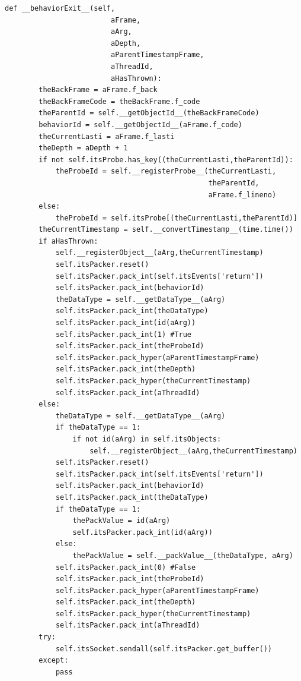 \documentclass[12pt,legalpaper]{report}
\begin{document}
\begin{singlespace}
\begin{lstlisting}[style=Python]
    def __behaviorExit__(self,
                         aFrame,
                         aArg,
                         aDepth,
                         aParentTimestampFrame,
                         aThreadId,
                         aHasThrown):
        theBackFrame = aFrame.f_back
        theBackFrameCode = theBackFrame.f_code
        theParentId = self.__getObjectId__(theBackFrameCode)
        behaviorId = self.__getObjectId__(aFrame.f_code)
        theCurrentLasti = aFrame.f_lasti
        theDepth = aDepth + 1
        if not self.itsProbe.has_key((theCurrentLasti,theParentId)):
            theProbeId = self.__registerProbe__(theCurrentLasti,
                                                theParentId,
                                                aFrame.f_lineno)
        else:
            theProbeId = self.itsProbe[(theCurrentLasti,theParentId)]
        theCurrentTimestamp = self.__convertTimestamp__(time.time())
        if aHasThrown:                  
            self.__registerObject__(aArg,theCurrentTimestamp)
            self.itsPacker.reset()
            self.itsPacker.pack_int(self.itsEvents['return'])
            self.itsPacker.pack_int(behaviorId)
            theDataType = self.__getDataType__(aArg)
            self.itsPacker.pack_int(theDataType)
            self.itsPacker.pack_int(id(aArg))
            self.itsPacker.pack_int(1) #True
            self.itsPacker.pack_int(theProbeId)
            self.itsPacker.pack_hyper(aParentTimestampFrame)        
            self.itsPacker.pack_int(theDepth)
            self.itsPacker.pack_hyper(theCurrentTimestamp)
            self.itsPacker.pack_int(aThreadId)
        else:
            theDataType = self.__getDataType__(aArg)
            if theDataType == 1:
                if not id(aArg) in self.itsObjects:
                    self.__registerObject__(aArg,theCurrentTimestamp)
            self.itsPacker.reset()
            self.itsPacker.pack_int(self.itsEvents['return'])
            self.itsPacker.pack_int(behaviorId)
            self.itsPacker.pack_int(theDataType)
            if theDataType == 1:
                thePackValue = id(aArg)
                self.itsPacker.pack_int(id(aArg))
            else:
                thePackValue = self.__packValue__(theDataType, aArg)            
            self.itsPacker.pack_int(0) #False
            self.itsPacker.pack_int(theProbeId)
            self.itsPacker.pack_hyper(aParentTimestampFrame)        
            self.itsPacker.pack_int(theDepth)
            self.itsPacker.pack_hyper(theCurrentTimestamp)
            self.itsPacker.pack_int(aThreadId)
        try:
            self.itsSocket.sendall(self.itsPacker.get_buffer())
        except:
            pass
        

\end{lstlisting}
\end{singlespace}
\end{document}
